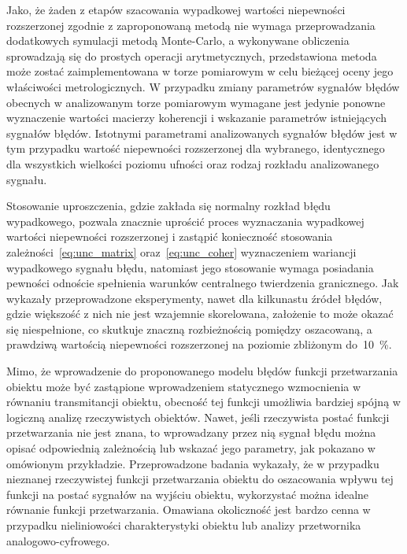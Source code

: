 Jako, że żaden z etapów szacowania wypadkowej wartości niepewności rozszerzonej zgodnie z zaproponowaną metodą nie wymaga przeprowadzania dodatkowych symulacji metodą Monte-Carlo, a wykonywane obliczenia sprowadzają się do prostych operacji arytmetycznych, przedstawiona metoda może zostać zaimplementowana w torze pomiarowym w celu bieżącej oceny jego właściwości metrologicznych. W przypadku zmiany parametrów sygnałów błędów obecnych w analizowanym torze pomiarowym wymagane jest jedynie ponowne wyznaczenie wartości macierzy koherencji i wskazanie parametrów istniejących sygnałów błędów. Istotnymi parametrami analizowanych sygnałów błędów jest w tym przypadku wartość niepewności rozszerzonej dla wybranego, identycznego dla wszystkich wielkości poziomu ufności oraz rodzaj rozkładu analizowanego sygnału.

Stosowanie uproszczenia, gdzie zakłada się normalny rozkład błędu wypadkowego, pozwala znacznie uprościć proces wyznaczania wypadkowej wartości niepewności rozszerzonej i zastąpić konieczność stosowania zależności~\eqref{eq:unc_matrix} oraz~\eqref{eq:unc_coher} wyznaczeniem wariancji wypadkowego sygnału błędu, natomiast jego stosowanie wymaga posiadania pewności odnoście spełnienia warunków centralnego twierdzenia granicznego. Jak wykazały przeprowadzone eksperymenty, nawet dla kilkunastu źródeł błędów, gdzie większość z nich nie jest wzajemnie skorelowana, założenie to może okazać się niespełnione, co skutkuje znaczną rozbieżnością pomiędzy oszacowaną, a prawdziwą wartością niepewności rozszerzonej na poziomie zbliżonym do~\qty{10}{\percent}.

Mimo, że wprowadzenie do proponowanego modelu błędów funkcji przetwarzania obiektu może być zastąpione wprowadzeniem statycznego wzmocnienia w równaniu transmitancji obiektu, obecność tej funkcji umożliwia bardziej spójną w logiczną analizę rzeczywistych obiektów. Nawet, jeśli rzeczywista postać funkcji przetwarzania nie jest znana, to wprowadzany przez nią sygnał błędu można opisać odpowiednią zależnością lub wskazać jego parametry, jak pokazano w omówionym przykładzie. Przeprowadzone badania wykazały, że w przypadku nieznanej rzeczywistej funkcji przetwarzania obiektu do oszacowania wpływu tej funkcji na postać sygnałów na wyjściu obiektu, wykorzystać można idealne równanie funkcji przetwarzania. Omawiana okoliczność jest bardzo cenna w przypadku nieliniowości charakterystyki obiektu lub analizy przetwornika analogowo-cyfrowego.
